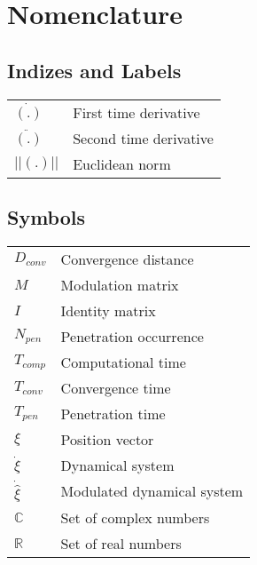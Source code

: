 \chapter*{Nomenclature} \label{chap:symbole}
\section*{Indizes and Labels} 
\begin{tabular}[h]{L{.2\textwidth} L{.8\textwidth}}
$\dot{(.)} $	& First time derivative \\
$\ddot{(.)}$ 	& Second time derivative \\
$|| (.) || $	& Euclidean norm \\
\end{tabular}

\section*{Symbols} 
\begin{tabular}[h]{L{.2\textwidth} L{.8\textwidth}} %
$D_{conv}$ 		& Convergence distance \\
$ M $ 			& Modulation matrix \\
$ I $			& Identity matrix \\
$N_{pen}$		& Penetration occurrence \\
$T_{comp}$		& Computational time \\
$T_{conv}$ 		& Convergence time \\
$T_{pen}$		& Penetration time \\
$\xi$			& Position vector \\
$\dot \xi$		& Dynamical system \\
$\dot{\hat{\xi}}$ & Modulated dynamical system \\
$\mathbb C$   	& Set of complex numbers\\
$\mathbb R$ 	& Set of real numbers\\
\end{tabular}

